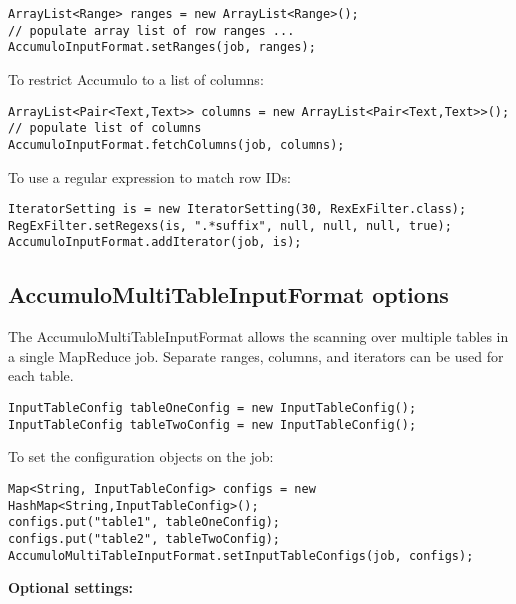 \begingroup\fontsize{8pt}{8pt}\selectfont\begin{verbatim}
ArrayList<Range> ranges = new ArrayList<Range>();
// populate array list of row ranges ...
AccumuloInputFormat.setRanges(job, ranges);
\end{verbatim}\endgroup

To restrict Accumulo to a list of columns:

\begingroup\fontsize{8pt}{8pt}\selectfont\begin{verbatim}
ArrayList<Pair<Text,Text>> columns = new ArrayList<Pair<Text,Text>>();
// populate list of columns
AccumuloInputFormat.fetchColumns(job, columns);
\end{verbatim}\endgroup

To use a regular expression to match row IDs:

\begingroup\fontsize{8pt}{8pt}\selectfont\begin{verbatim}
IteratorSetting is = new IteratorSetting(30, RexExFilter.class);
RegExFilter.setRegexs(is, ".*suffix", null, null, null, true);
AccumuloInputFormat.addIterator(job, is);
\end{verbatim}\endgroup

\subsection{AccumuloMultiTableInputFormat options}

The AccumuloMultiTableInputFormat allows the scanning over multiple tables 
in a single MapReduce job. Separate ranges, columns, and iterators can be 
used for each table. 

\begingroup\fontsize{8pt}{8pt}\selectfont\begin{verbatim}
InputTableConfig tableOneConfig = new InputTableConfig();
InputTableConfig tableTwoConfig = new InputTableConfig();
\end{verbatim}\endgroup

To set the configuration objects on the job:

\begingroup\fontsize{8pt}{8pt}\selectfont\begin{verbatim}
Map<String, InputTableConfig> configs = new HashMap<String,InputTableConfig>();
configs.put("table1", tableOneConfig);
configs.put("table2", tableTwoConfig);
AccumuloMultiTableInputFormat.setInputTableConfigs(job, configs);
\end{verbatim}\endgroup

\Large
\textbf{Optional settings:}
\normalsize

